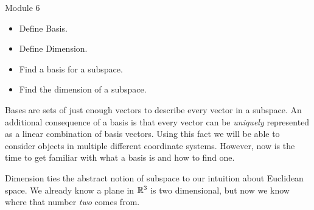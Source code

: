 \documentclass{workbook}
\begin{document}
\begin{lesson}

	Module 6

	\begin{itemize}
		\item Define Basis.
		\item Define Dimension.
		\item Find a basis for a subspace.
		\item Find the dimension of a subspace.
	\end{itemize}

	Bases are sets of just enough vectors to describe every vector in a subspace.
	An additional consequence of a basis is that every vector can be \emph{uniquely}
	represented as a linear combination of basis vectors. Using this fact we
	will be able to consider objects in multiple different coordinate systems. However,
	now is the time to get familiar with what a basis is and how to find one.

	Dimension ties the abstract notion of subspace to our intuition about
	Euclidean space. We already know a plane in $\mathbb{R}^3$ is two dimensional,
	but now we know where that number \emph{two} comes from.

\end{lesson}
\end{document}
